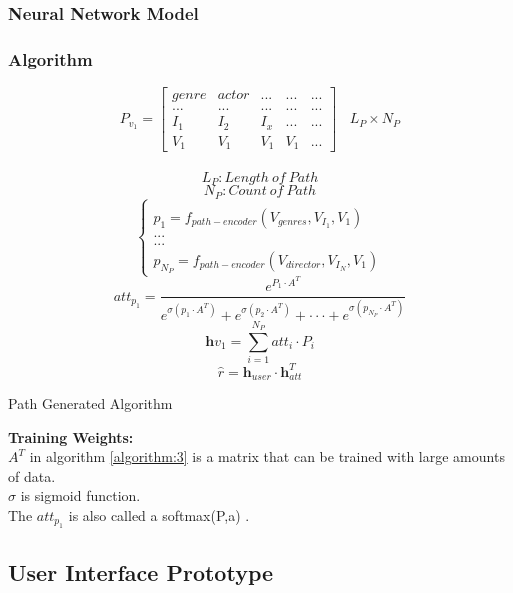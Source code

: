 \subsubsection{Neural Network Model}
\subsubsection{Algorithm}

\begin{algorithm}[H]
\SetAlgoLined
\KwResult{ \[ P_{v_{1}} \] \[ \hat{r} \] }

\[
P_{v_{1}} = \begin{bmatrix}
 genre & actor  & ... & ... & ... \\ 
 ... & ...  & ... & ... & ... \\ 
 I_{1}& I_{2} & I_{x} & ... & ... \\ 
 V_{1} & V_{1}  & V_{1}  & V_{1} & ...
\end{bmatrix}
\ \ \ \ L_{P}\times N_{P}
\]
\\
\[
L_{P} : Length \ of \ Path
\]
\[
N_{P} : Count \ of \ Path
\]
\[
\left\{\begin{matrix}
\\ p_{1} = f_{path-encoder} (V_{genres},V_{I_{1}},V_{1})
\\ ...
\\ ...
\\ p_{N_{P}} = f_{path-encoder} (V_{director},V_{I_{N}},V_{1})

\end{matrix}\right.
\]
\[
att_{p_{1}} = \frac{e^{P_{1} \cdot A^{T}}}{e^{\sigma(p_{1}\cdot A^{T})}  +  e^{\sigma(p_{2}\cdot A^{T})}  + \cdot \cdot \cdot +e^{\sigma(p_{N_{P}}\cdot A^{T})}}
\]
\[
\textbf{h}v_{1} =  \sum_{i=1}^{N_{P}} att_{i}\cdot P_{i}
\]
\[
\hat{r} = \textbf{h}_{user}\cdot \textbf{h}_{att}^{T}
\]
 
\caption{Path Generated Algorithm}
\label{algorithm:3}
\end{algorithm}

\textbf{Training Weights:}\\
$ A^{T} $ in algorithm \ref{algorithm:3} is a matrix that can be trained with large amounts of data. \\
$ \sigma $ is sigmoid function.\\
The $ att_{p_{1}} $ is also called a softmax(P,a) \cite{wu2016deep}.

\subsection{User Interface Prototype} 

